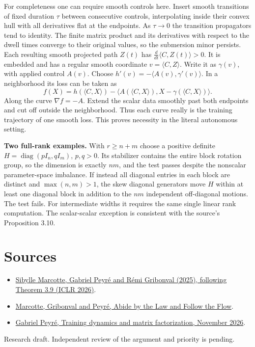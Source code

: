 \documentclass[10pt]{article}
\begin{document}
For completeness one can require smooth controls here. Insert smooth transitions of fixed duration $\tau$ between consecutive controls, interpolating inside their convex hull with all derivatives flat at the endpoints. As $\tau\to0$ the transition propagators tend to identity. The finite matrix product and its derivatives with respect to the dwell times converge to their original values, so the submersion minor persists. Each resulting smooth projected path $Z(t)$ has $\frac d{dt}\langle C,Z(t)\rangle>0$. It is embedded and has a regular smooth coordinate $v=\langle C,Z\rangle$. Write it as $\gamma(v)$, with applied control $A(v)$. Choose $h'(v)=-\langle A(v),\gamma'(v)\rangle$. In a neighborhood its loss can be taken as
\[
 f(X)=h(\langle C,X\rangle)-\langle A(\langle C,X\rangle),X-\gamma(\langle C,X\rangle)\rangle .
\]
Along the curve $\nabla f=-A$. Extend the scalar data smoothly past both endpoints and cut off outside the neighborhood. Thus each curve really is the training trajectory of one smooth loss. This proves necessity in the literal autonomous setting.

\textbf{Two full-rank examples.} With $r\ge n+m$ choose a positive definite $H=\operatorname{diag}(pI_n,qI_m)$, $p,q>0$. Its stabilizer contains the entire block rotation group, so the dimension is exactly $nm$, and the test passes despite the nonscalar parameter-space imbalance. If instead all diagonal entries in each block are distinct and $\max(n,m)>1$, the skew diagonal generators move $H$ within at least one diagonal block in addition to the $nm$ independent off-diagonal motions. The test fails. For intermediate widths it requires the same single linear rank computation. The scalar-scalar exception is consistent with the source's Proposition 3.10.

\section*{Sources}
\begin{itemize}
\item \href{https://arxiv.org/abs/2508.07370}{Sibylle Marcotte, Gabriel Peyré and Rémi Gribonval (2025), following Theorem 3.9 (ICLR 2026)}.
\item \href{https://arxiv.org/abs/2307.00144}{Marcotte, Gribonval and Peyré, Abide by the Law and Follow the Flow}.
\item \href{https://www.gpeyre.com/blog/2026/11/12/intrinsic-factor-training-dynamics/}{Gabriel Peyré, Training dynamics and matrix factorization, November 2026}.
\end{itemize}
{\small Research draft. Independent review of the argument and priority is pending.}
\end{document}
